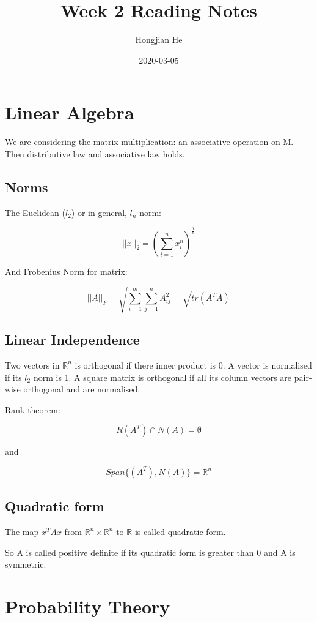 \documentclass{article}
\title{Week 2 Reading Notes}
\date{2020-03-05}
\author{Hongjian He}
\begin{document}
  \maketitle
  \newpage

\section{Linear Algebra}

We are considering the matrix multiplication: an associative operation on M. Then distributive
law and associative law holds.

\subsection{Norms}

The Euclidean ($l_2$) or in general, $l_n$ norm:

$$
||x||_2 = (\sum_{i=1}^n x_i^n)^{\frac{1}{n}}
$$

And Frobenius Norm for matrix:

$$
||A||_F = \sqrt{\sum_{i=1}^m\sum_{j=1}^n A_{ij}^2} =\sqrt{tr(A^TA)}
$$

\subsection{Linear Independence}

Two vectors in $\mathbb{R}^n$ is orthogonal if there inner product is 0. A vector is normalised 
if its $l_2$ norm is 1. A square matrix is orthogonal if all its column vectors are pair-wise 
orthogonal and are normalised.

Rank theorem:

$$
R(A^T)\cap N(A)=\emptyset
$$

and

$$
Span\{(A^T),N(A)\}=\mathbb{R}^n
$$

\subsection{Quadratic form}

The map $x^TAx$ from $\mathbb{R}^n \times \mathbb{R}^n$ to $\mathbb{R}$ is called quadratic form.

So A is called positive definite if its quadratic form is greater than 0 and A is symmetric.



\section{Probability Theory}
\end{document}
